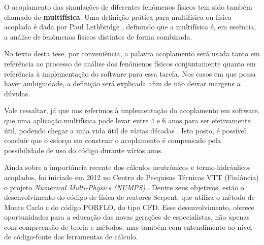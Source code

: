 O acoplamento das simulações de diferentes fenômenos físicos tem sido também chamado de \textbf{multifísica}. 
Uma definição prática para multifísica ou física-acoplada é dada por Paul Lethbridge \cite{Lethbridge2005}, definindo que 
a multifísica é, em essência, a análise de fenômenos físicos distintos de forma combinada.

No texto desta tese, 
por conveniência, a palavra acoplamento será usada tanto em referência ao processo de análise dos fenômenos físicos conjuntamente 
quanto em referência à implementação do software para essa tarefa. Nos casos em que possa haver ambiguidade, 
a definição será explicada afim de não deixar margens a dúvidas.

Vale ressaltar, já que nos referimos à implementação do acoplamento em software, que uma aplicação multifísica 
pode levar entre 4 e 6 anos para ser efetivamente útil, podendo chegar a uma vida útil de várias décadas 
\cite{Graham2004}. Isto posto, é possível concluir que o esforço em construir o acoplamento é compensado 
pela possibilidade de uso do código durante vários anos.

Ainda sobre a importância recente dos cálculos neutrônicos e termo-hidráulicos acoplados, foi iniciado em 2012
no Centro de Pesquisas Técnicas VTT (Finlância) o projeto \textit{Numerical Multi-Physics (NUMPS)} \cite{Leppanen2015}.
Dentre seus objetivos, estão o desenvolvimento do código de física de reatores Serpent, que utiliza o método de
Monte Carlo e do código PORFLO, do tipo CFD. Esse desenvolvimento, oferece oportunidades para a educação das novas
gerações de especialistas, não apenas com compreensão de teoria e métodos, mas também com entendimento ao nível de
código-fonte das ferramentas de cálculo.

